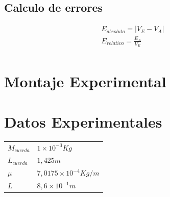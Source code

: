 \documentclass[twocolumn, 12pt]{article}
\begin{document}
\subsection{Calculo de errores}

{\large
    \begin{equation}
        \begin{gathered}
            E_{absoluto} = \left\lvert V_E - V_A\right\rvert \\
            E_{relativo} = \frac{E_A}{V_E} \\
        \end{gathered}
        \label{eq:calculo-errores}
    \end{equation}
}

\section{Montaje Experimental}

\section{Datos Experimentales}

\begin{table}[H]
    \begin{center}
        \begin{tabularx}{0.9\linewidth}{|>{\centering\arraybackslash}X|>{\centering\arraybackslash}X|}
            \hline
            \multicolumn{2}{|c|}{\textbf{Constantes}}   \\\hline
            $M_{cuerda}$ & $1 \times 10^{-3} Kg$        \\\hline
            $L_{cuerda}$ & $1,425 m$                    \\\hline
            $\mu$        & $7,0175 \times 10^{-4} Kg/m$ \\\hline
            $L$          & $8,6 \times 10^{-1} m$       \\\hline
        \end{tabularx}
    \end{center}
\end{table}
\end{document}
